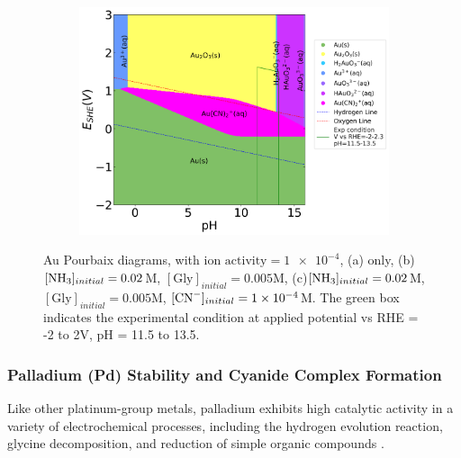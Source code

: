 \documentclass[journal=jacsat,manuscript=article]{achemso}
\begin{document}
\begin{figure}[htbp]
\begin{subfigure}[b]{0.3\textwidth}
    \end{subfigure}
    \begin{subfigure}[b]{0.3\textwidth}
        \subcaption{}\label{fig:Au_Pourbaix_NH3_Gly_CN}
        \includegraphics[width=\textwidth]{Figures/pourbaix_diagrams/Au-NH3-H2O_activity=1e-04_[NH3]=0.02M_[Gly]=0.005M_[CN]=0.0001.png}
    \end{subfigure}
    \caption{Au Pourbaix diagrams, with $\text{ion activity}=\num{1e-4}$, (a) only, (b)$[\ce{NH3}]_{initial}= 0.02$M, $[\text{Gly}]_{initial}=0.005$M, (c)$[\ce{NH3}]_{initial}= 0.02$M, $[\text{Gly}]_{initial}=0.005$M,  $[\ce{CN-}]_{initial}=\num{1e-4}$M. The green box indicates the experimental condition at applied potential vs RHE = -2 to 2V, pH = 11.5 to 13.5.}
    \label{fig:Au_Pourbaix}
\end{figure}

\subsubsection{Palladium (Pd) Stability and Cyanide Complex Formation} 

Like other platinum-group metals, palladium exhibits high catalytic activity in a variety of electrochemical processes, including the hydrogen evolution reaction,  glycine decomposition, and reduction of simple organic compounds \cite{Grden2008ElectrochemicalAdsorption, Baldauf1996FormicElectrodes, Simonet2005TheRadicals, ukaszewski2003ElectrosorptionAlloys, Jiang2021SpectrometricElectrodes, Rugira2025ExperimentalHydrodechlorination, Gao2007ChemistryStudy, Burke1993AnAcid}.
\end{document}
